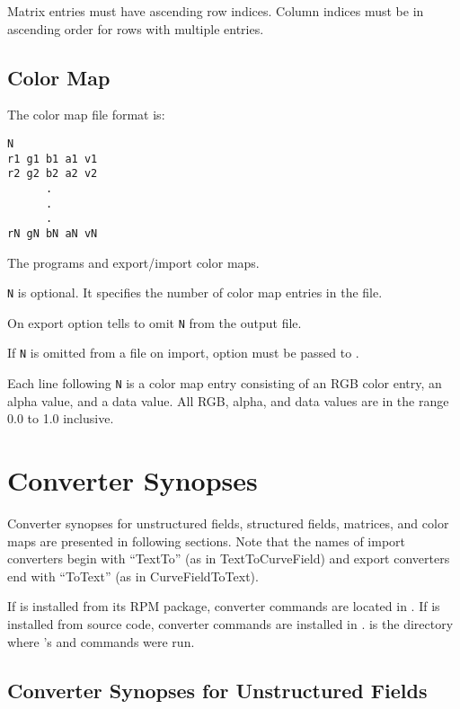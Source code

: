 Matrix entries must have ascending row indices. Column indices must be
in ascending order for rows with multiple entries.

\subsection{Color Map}
\label{sec:colormap_fmt}

The color map file format is:

\begin{verbatim}
N
r1 g1 b1 a1 v1
r2 g2 b2 a2 v2
      .
      .
      .
rN gN bN aN vN
\end{verbatim}

The programs  and 
export/import color maps.

\verb|N| is optional.  It specifies the number of color map entries in
the file.

On export option  tells  to
omit \verb|N| from the output file.

If \verb|N| is omitted from a file on import, option
 must be passed to .

Each line following \verb|N| is a color map entry consisting of an RGB
color entry, an alpha value, and a data value.  All RGB, alpha, and
data values are in the range 0.0 to 1.0 inclusive.

\section{Converter Synopses}
\label{sec:converter_synopses}

Converter synopses for unstructured fields, structured fields, matrices,
and color maps are presented in following sections.   Note that
the names of import converters begin with ``TextTo'' (as in
TextToCurveField) and export converters end with ``ToText'' (as in
CurveFieldToText).

If \sr{} is installed from its RPM package, converter commands are
located in .  If \sr{} is installed
from source code, converter commands are installed in
.   is
the directory where \sr{}'s  and 
commands were run.

\subsection{Converter Synopses for Unstructured Fields}
\label{sec:unstruct_field_synopses}


